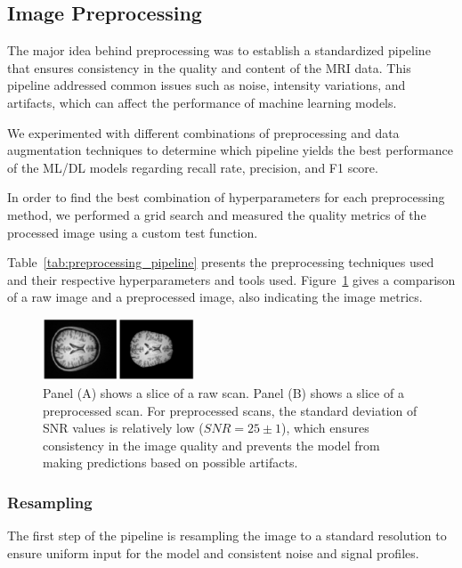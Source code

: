 %
\subsection{Image Preprocessing}

The major idea behind preprocessing was to establish a standardized pipeline that ensures consistency in the quality and content of the MRI data. This pipeline addressed common issues such as noise, intensity variations, and artifacts, which can affect the performance of machine learning models.

We experimented with different combinations of preprocessing and data augmentation techniques to determine which pipeline yields the best performance of the ML/DL models regarding recall rate, precision, and F1 score.

In order to find the best combination of hyperparameters for each preprocessing method, we performed a grid search and measured the quality metrics of the processed image using a custom test function.

Table~\ref{tab:preprocessing_pipeline} presents the preprocessing techniques used and their respective hyperparameters and tools used. Figure~\ref{fig:test_pipeline} gives a comparison of a raw image and a preprocessed image, also indicating the image metrics.
%
\begin{figure}[h]
    \centering
    \includegraphics[width=0.4\textwidth]{./figs/slice_comparison.png} %
    \caption{Panel (A) shows a slice of a raw scan. Panel (B) shows a slice of a preprocessed scan. For preprocessed scans, the standard deviation of SNR values is relatively low (\mbox{$SNR= 25 \pm 1$}), which ensures consistency in the image quality and prevents the model from making predictions based on possible artifacts.}\label{fig:test_pipeline}
\end{figure}

\subsubsection{Resampling}

The first step of the pipeline is resampling the image to a standard resolution to ensure uniform input for the model and consistent noise and signal profiles.

